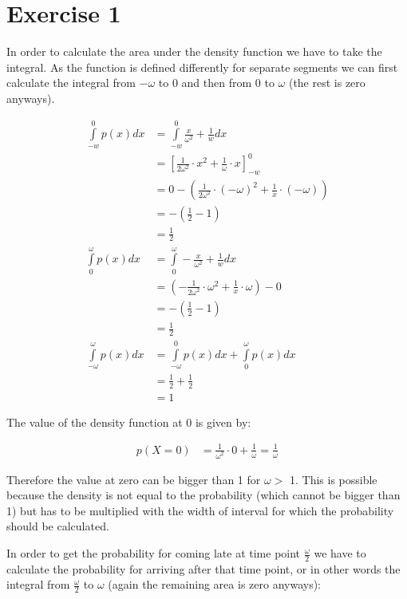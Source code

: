 \def \TutorialSheetNumber{4}



\section*{Exercise 1}
In order to calculate the area under the density function we have to take the integral. As the function is defined differently for separate segments we can first calculate the integral from $-\omega$ to 0 and then from 0 to $\omega$ (the rest is zero anyways).

\begin{align*}
\int \limits_{-w}^{0}p(x) dx & = \int \limits_{-w}^{0} \frac{x}{\omega^2} + \frac{1}{w} dx \\
& =     \left[\frac{1}{2\omega ^2} \cdot x^2 + \frac{1}{\omega } \cdot x \right]_{-w}^{0} \\
& = 0 - \left(\frac{1}{2\omega ^2} \cdot \left(- \omega\right)^2 + \frac{1}{x} \cdot \left(-\omega\right) \right) \\
& = -\left(\frac{1}{2} - 1\right) \\
& = \frac{1}{2}\\
\int \limits_{0}^{\omega}p(x) dx & = \int \limits_{0}^{\omega} -\frac{x}{\omega^2} + \frac{1}{w} dx \\
& = \left(-\frac{1}{2\omega ^2} \cdot \omega^2 + \frac{1}{x} \cdot \omega\right) - 0 \\
& = -\left(\frac{1}{2} - 1\right) \\
& = \frac{1}{2}\\
\int \limits_{-\omega}^{\omega}p(x) dx & = \int \limits_{-\omega}^{0}p(x) dx +\int \limits_{0}^{\omega}p(x) dx \\
& = \frac{1}{2} + \frac{1}{2} \\
& = 1
\end{align*}

The value of the density function at 0 is given by:

\begin{align*}
p(X=0) & = \frac{1}{\omega^2} \cdot 0 + \frac{1}{\omega} = \frac{1}{\omega}
\end{align*}

Therefore the value at zero can be bigger than 1 for $\omega >$ 1. This is possible because the density is not equal to the probability (which cannot be bigger than 1) but has to be multiplied with the width of interval for which the probability should be calculated.

In order to get the probability for coming late at time point $\frac{\omega}{2}$ we have to calculate the probability for arriving after that time point, or in other words the integral from $\frac{\omega}{2}$ to $\omega$ (again the remaining area is zero anyways):

